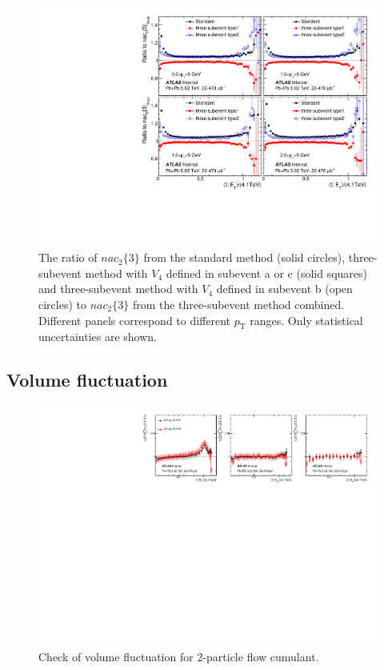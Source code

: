 \begin{figure}[H]
\centering
\includegraphics[width=.6\linewidth]{figs/sec_paper/nac_decorr2.pdf}
\caption{The ratio of $nac_2\{3\}$ from the standard method (solid circles), three-subevent method with $V_4$ defined in subevent a or c (solid squares) and three-subevent method with $V_4$ defined in subevent b (open circles) to $nac_2\{3\}$ from the three-subevent method combined. Different panels correspond to different $p_\text{T}$ ranges. Only statistical uncertainties are shown.}
\label{fig:paper_nac_decorr2}
\end{figure}

\subsection{Volume fluctuation}

\begin{figure}[H]
\centering
\includegraphics[width=.96\linewidth]{figs/sec_paper/comp_vn2rat_FCal.pdf}
\caption{Check of volume fluctuation for 2-particle flow cumulant.}
\label{fig:paper_vf_v2}
\end{figure}

